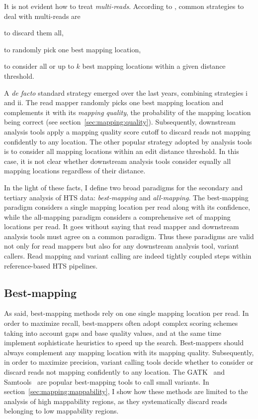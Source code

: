It is not evident how to treat \emph{multi-reads}.
According to \citeauthor{Treangen2011}, common strategies to deal with multi-reads are
\begin{inparaenum}[(i)]
\item to discard them all,
\item to randomly pick one best mapping location,
\item to consider all or up to $k$ best mapping locations within a given distance threshold.
\end{inparaenum}
A \emph{de facto} standard strategy emerged over the last years, combining strategies i and ii.
The read mapper randomly picks one best mapping location and complements it with its \emph{mapping quality}, \ie the probability of the mapping location being correct (see section~\ref{sec:mapping:quality}).
Subsequently, downstream analysis tools apply a mapping quality score cutoff to discard reads not mapping confidently to any location.
The other popular strategy adopted by analysis tools is to consider all mapping locations within an edit distance threshold.
In this case, it is not clear whether downstream analysis tools consider equally all mapping locations regardless of their distance.

In the light of these facts, I define two broad paradigms for the secondary and tertiary analysis of HTS data: \emph{best-mapping} and \emph{all-mapping}.
The best-mapping paradigm considers a single mapping location per read along with its confidence, while the all-mapping paradigm considers a comprehensive set of mapping locations per read.
It goes without saying that read mapper and downstream analysis tools must agree on a common paradigm.
Thus these paradigms are valid not only for read mappers but also for any downstream analysis tool, \eg variant callers.
Read mapping and variant calling are indeed tightly coupled steps within reference-based HTS pipelines.

\subsection{Best-mapping}
As said, best-mapping methods rely on one single mapping location per read.
In order to maximize recall, best-mappers often adopt complex scoring schemes taking into account gaps and base quality values, and at the same time implement sophisticate heuristics to speed up the search.
Best-mappers should always complement any mapping location with its mapping quality.
Subsequently, in order to maximize precision, variant calling tools decide whether to consider or discard reads not mapping confidently to any location.
The GATK~\citep{DePristo2011} and Samtools~\citep{Li2009a} are popular best-mapping tools to call small variants.
In section~\ref{sec:mapping:mappability}, I show how these methods are limited to the analysis of high mappability regions, as they systematically discard reads belonging to low mappability regions.

